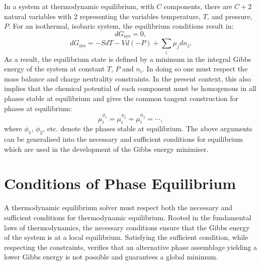     In a system at thermodynamic equilibrium, with $C$ components, there are $C+2$ natural variables with $2$ representing the variables temperature, $T$, and pressure, $P$. For an isothermal, isobaric system, the equilibrium conditions result in:
    \begin{equation}
        d G_{\text{sys}} = 0,
    \end{equation}
    \begin{equation}
        d G_{\text{sys}} = -S dT -Vd(-P) + \sum_{i} \mu_j d n_j.
    \end{equation}
    As a result, the equilibrium state is defined by a minimum in the integral Gibbs energy of the system at constant $T$, $P$ and $n_i$. In doing so one must respect the mass balance and charge neutrality constraints. In the present context, this also implies that the chemical potential of each component must be homogenous in all phases stable at equilibrium and gives the common tangent construction for phases at equilibrium:
    \begin{equation}
        \mu_{i}^{\phi_1} = \mu_{i}^{\phi_2} = \mu_{i}^{\phi_2} = \cdots,
    \end{equation}
    where $\phi_1$, $\phi_2$, etc. denote the phases stable at equilibrium. The above arguments can be generalised into the necessary and sufficient conditions for equilibrium which are used in the development of the Gibbs energy minimiser. 

\section{Conditions of Phase Equilibrium} \label{sec:eqb_theory}
A thermodynamic equilibrium solver must respect both the necessary and sufficient conditions for thermodynamic equilibrium. Rooted in the fundamental laws of thermodynamics, the necessary conditions  ensure that the Gibbs energy of the system is at a local equilibrium. Satisfying the sufficient condition, while respecting the constraints, verifies that an alternative phase assemblage yielding a lower Gibbs energy is not possible and guarantees a global minimum.

